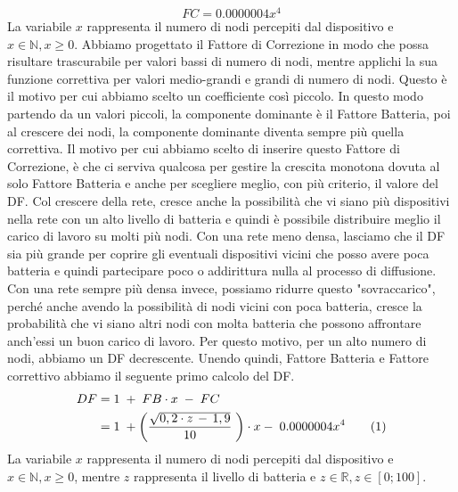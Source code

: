 \begin{equation}
	\label{eq:df_FC}
	FC = 0.0000004x^4
\end{equation}
La variabile $\textit{x}$ rappresenta il numero di nodi percepiti dal dispositivo e $ \textit{x}\in\mathbb{N},x\geq0$. Abbiamo progettato il Fattore di Correzione in modo che possa risultare trascurabile per valori bassi di numero di nodi, mentre applichi la sua funzione correttiva per valori medio-grandi e grandi di numero di nodi. Questo è il motivo per cui abbiamo scelto un coefficiente così piccolo. In questo modo partendo da un valori piccoli, la componente dominante è il Fattore Batteria, poi al crescere dei nodi, la componente dominante diventa sempre più quella correttiva. Il motivo per cui abbiamo scelto di inserire questo Fattore di Correzione, è che ci serviva qualcosa per gestire la crescita monotona dovuta al solo Fattore Batteria e anche per scegliere meglio, con più criterio, il valore del \acs{DF}. Col crescere della rete, cresce anche la possibilità che vi siano più dispositivi nella rete con un alto livello di batteria e quindi è possibile distribuire meglio il carico di lavoro su molti più nodi. Con una rete meno densa, lasciamo che il \acs{DF} sia più grande per coprire gli eventuali dispositivi vicini che posso avere poca batteria e quindi partecipare poco o addirittura nulla al processo di diffusione. Con una rete sempre più densa invece, possiamo ridurre questo "sovraccarico", perché anche avendo la possibilità di nodi vicini con poca batteria, cresce la probabilità che vi siano altri nodi con molta batteria che possono affrontare anch'essi un buon carico di lavoro. Per questo motivo, per un alto numero di nodi, abbiamo un \acs{DF} decrescente.
Unendo quindi, Fattore Batteria e Fattore correttivo abbiamo il seguente primo calcolo del \acs{DF}.
\begin{align*}
	\label{eq:DF_no_asint}
	DF &= 1 \; + \; FB\cdot x \; - \; FC\\
	&= 1 \; + \left( \dfrac{\sqrt{0,2\cdot z\,-\,1,9}}{10}\; \right) \cdot x- \; 0.0000004x^4 \addtocounter{equation}{1}\tag{\theequation}
\end{align*}
La variabile $\textit{x}$ rappresenta il numero di nodi percepiti dal dispositivo e $ \textit{x}\in\mathbb{N},x\geq0$, mentre $\textit{z}$ rappresenta il livello di batteria e $\textit{z}\in \mathbb{R}, \textit{z}\in[0;100]$.
